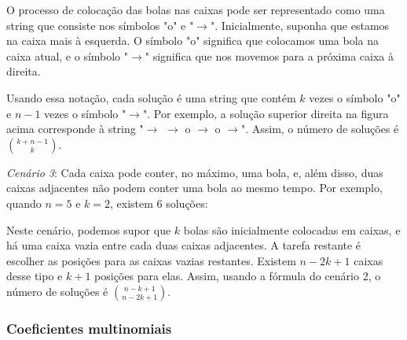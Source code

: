 O processo de colocação das bolas nas caixas
pode ser representado como uma string
que consiste nos símbolos
"o" e "$\rightarrow$".
Inicialmente, suponha que estamos na caixa mais à esquerda.
O símbolo "o" significa que colocamos uma bola
na caixa atual, e o símbolo
"$\rightarrow$" significa que nos movemos para
a próxima caixa à direita.

Usando essa notação, cada solução é uma string
que contém $k$ vezes o símbolo "o" e
$n-1$ vezes o símbolo "$\rightarrow$".
Por exemplo, a solução superior direita
na figura acima corresponde à string
"$\rightarrow$ $\rightarrow$ o $\rightarrow$ o $\rightarrow$".
Assim, o número de soluções é
${k+n-1 \choose k}$.

\textit{Cenário 3}: Cada caixa pode conter, no máximo, uma bola,
e, além disso, duas caixas adjacentes não podem conter uma bola ao mesmo tempo.
Por exemplo, quando $n=5$ e $k=2$,
existem 6 soluções:


\begin{center}
\end{center}

Neste cenário, podemos supor que
$k$ bolas são inicialmente colocadas em caixas,
e há uma caixa vazia entre cada
duas caixas adjacentes.
A tarefa restante é escolher as
posições para as caixas vazias restantes.
Existem $n-2k+1$ caixas desse tipo e
$k+1$ posições para elas.
Assim, usando a fórmula do cenário 2,
o número de soluções é
${n-k+1 \choose n-2k+1}$.

\subsubsection{Coeficientes multinomiais}

